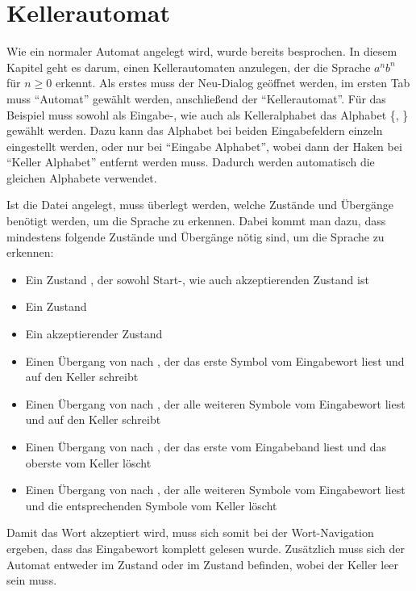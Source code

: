 \section{Kellerautomat}
Wie ein normaler Automat angelegt wird, wurde bereits besprochen. In diesem
Kapitel geht es darum, einen Kellerautomaten anzulegen, der die Sprache $a^n
b^n$ für $n \geq 0$ erkennt. Als erstes muss der Neu-Dialog geöffnet werden, im ersten
Tab muss "`Automat"' gewählt werden, anschließend der "`Kellerautomat"'. Für
das Beispiel muss sowohl als Eingabe-, wie auch als Kelleralphabet das Alphabet
\{, \} gewählt werden. Dazu kann das Alphabet bei beiden
Eingabefeldern einzeln eingestellt werden, oder nur bei "`Eingabe Alphabet"',
wobei dann der Haken bei "`Keller Alphabet"' entfernt werden muss. Dadurch werden
automatisch die gleichen Alphabete verwendet.\vspace{10pt}

Ist die Datei angelegt, muss überlegt werden, welche Zustände und Übergänge
benötigt werden, um die Sprache zu erkennen. Dabei kommt man dazu, dass
mindestens folgende Zustände und Übergänge nötig sind, um die Sprache zu
erkennen:

\begin{itemize}
  \item Ein Zustand , der sowohl Start-, wie auch akzeptierenden
  Zustand ist
  \item Ein Zustand 
  \item Ein akzeptierender Zustand 
  \item Einen Übergang von  nach , der das erste Symbol
   vom Eingabewort liest und auf den Keller schreibt
  \item Einen Übergang von  nach , der alle weiteren Symbole
   vom Eingabewort liest und auf den Keller schreibt
  \item Einen Übergang von  nach , der das erste 
  vom Eingabeband liest und das oberste  vom Keller löscht
  \item Einen Übergang von  nach , der alle weiteren
  Symbole  vom Eingabewort liest und die entsprechenden Symbole
   vom Keller löscht
\end{itemize}

Damit das Wort akzeptiert wird, muss sich somit bei der Wort-Navigation ergeben,
dass das Eingabewort komplett gelesen wurde. Zusätzlich muss sich der Automat
entweder im Zustand  oder im Zustand  befinden, wobei der
Keller leer sein muss.\vspace{10pt}

